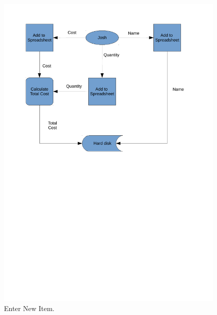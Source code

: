 \begin{figure}[H]
    \caption{Enter New Item.} \label{fig:print_function_result}
    \includegraphics[width=\textwidth]{./Analysis/Dataflow/Data_flow_new.pdf}
\end{figure}

